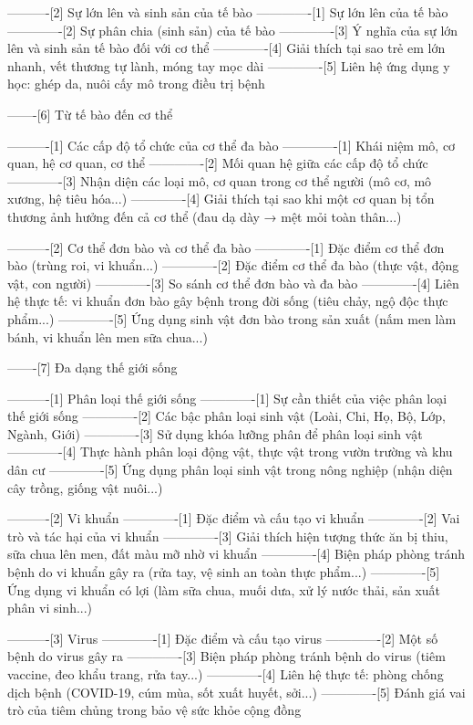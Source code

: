 ----------[2] Sự lớn lên và sinh sản của tế bào
-------------[1] Sự lớn lên của tế bào
-------------[2] Sự phân chia (sinh sản) của tế bào
-------------[3] Ý nghĩa của sự lớn lên và sinh sản tế bào đối với cơ thể
-------------[4] Giải thích tại sao trẻ em lớn nhanh, vết thương tự lành, móng tay mọc dài
-------------[5] Liên hệ ứng dụng y học: ghép da, nuôi cấy mô trong điều trị bệnh

-------[6] Từ tế bào đến cơ thể

----------[1] Các cấp độ tổ chức của cơ thể đa bào
-------------[1] Khái niệm mô, cơ quan, hệ cơ quan, cơ thể
-------------[2] Mối quan hệ giữa các cấp độ tổ chức
-------------[3] Nhận diện các loại mô, cơ quan trong cơ thể người (mô cơ, mô xương, hệ tiêu hóa...)
-------------[4] Giải thích tại sao khi một cơ quan bị tổn thương ảnh hưởng đến cả cơ thể (đau dạ dày → mệt mỏi toàn thân...)

----------[2] Cơ thể đơn bào và cơ thể đa bào
-------------[1] Đặc điểm cơ thể đơn bào (trùng roi, vi khuẩn...)
-------------[2] Đặc điểm cơ thể đa bào (thực vật, động vật, con người)
-------------[3] So sánh cơ thể đơn bào và đa bào
-------------[4] Liên hệ thực tế: vi khuẩn đơn bào gây bệnh trong đời sống (tiêu chảy, ngộ độc thực phẩm...)
-------------[5] Ứng dụng sinh vật đơn bào trong sản xuất (nấm men làm bánh, vi khuẩn lên men sữa chua...)

-------[7] Đa dạng thế giới sống

----------[1] Phân loại thế giới sống
-------------[1] Sự cần thiết của việc phân loại thế giới sống
-------------[2] Các bậc phân loại sinh vật (Loài, Chi, Họ, Bộ, Lớp, Ngành, Giới)
-------------[3] Sử dụng khóa lưỡng phân để phân loại sinh vật
-------------[4] Thực hành phân loại động vật, thực vật trong vườn trường và khu dân cư
-------------[5] Ứng dụng phân loại sinh vật trong nông nghiệp (nhận diện cây trồng, giống vật nuôi...)

----------[2] Vi khuẩn
-------------[1] Đặc điểm và cấu tạo vi khuẩn
-------------[2] Vai trò và tác hại của vi khuẩn
-------------[3] Giải thích hiện tượng thức ăn bị thiu, sữa chua lên men, đất màu mỡ nhờ vi khuẩn
-------------[4] Biện pháp phòng tránh bệnh do vi khuẩn gây ra (rửa tay, vệ sinh an toàn thực phẩm...)
-------------[5] Ứng dụng vi khuẩn có lợi (làm sữa chua, muối dưa, xử lý nước thải, sản xuất phân vi sinh...)

----------[3] Virus
-------------[1] Đặc điểm và cấu tạo virus
-------------[2] Một số bệnh do virus gây ra
-------------[3] Biện pháp phòng tránh bệnh do virus (tiêm vaccine, đeo khẩu trang, rửa tay...)
-------------[4] Liên hệ thực tế: phòng chống dịch bệnh (COVID-19, cúm mùa, sốt xuất huyết, sởi...)
-------------[5] Đánh giá vai trò của tiêm chủng trong bảo vệ sức khỏe cộng đồng

